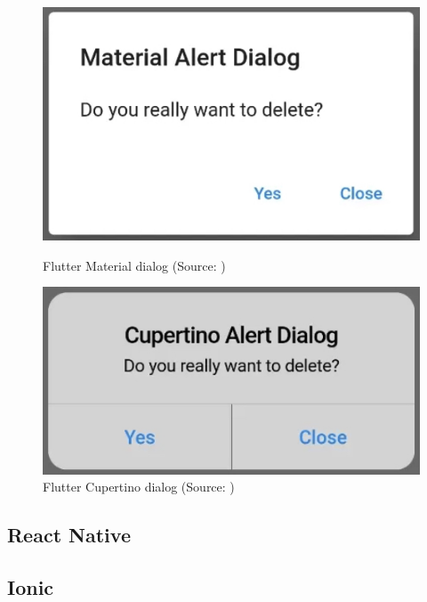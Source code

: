 \begin{figure}[h]
	\begin{minipage}{.47\textwidth}
	  \includegraphics[width=\textwidth]{img/flutter_material_dialog}
	  \caption{Flutter Material dialog (Source: \cite{flutter_campus_dialog})}
	  \label{fig:flutter_material_dialog}
	\end{minipage}
	\hfill
	\begin{minipage}{.47\textwidth}
	  \includegraphics[width=\textwidth]{img/flutter_cupertino_dialog}
	  \caption{Flutter Cupertino dialog (Source: \cite{flutter_campus_dialog})}
	  \label{fig:flutter_cupertino_dialog}
	\end{minipage}
  \end{figure}

\subsection{React Native}



\subsection{Ionic}



